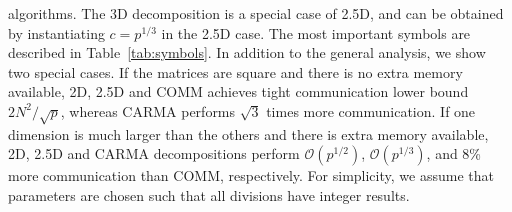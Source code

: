 \documentclass[sigplan,review,anonymous,10pt]{acmart}\settopmatter{printfolios=true,printccs=false,printacmref=false}
\newcommand\greg[1]{\textcolor{blue}{[Greg: #1]}}
\newcommand\mac[1]{\textcolor{red}{[Mac: #1]}}
\begin{document}
\begin{table}
{		algorithms. The 3D decomposition is a special case of 2.5D, and can be 
		obtained 
		by
		instantiating $c=p^{1/3}$ in the 2.5D case.
		The most important symbols are described in Table~\ref{tab:symbols}. In 
		addition to the general analysis, we show two special cases. If the 
		matrices 
		are 
		square and there is no extra memory available, 2D, 2.5D and COMM 
		achieves tight 
		communication lower bound $2N^2/\sqrt{p}$, whereas CARMA performs 
		$\sqrt{3}$ 
		times more 
		communication. If one dimension is much larger than the others and 
		there is 
		extra memory available, 2D, 2.5D and CARMA decompositions perform 
		$\mathcal{O}(p^{1/2})$, $\mathcal{O}(p^{1/3})$, and 8\%  more 
		communication 
		than COMM, respectively. For simplicity, we assume that
		parameters are chosen such that all divisions have integer results.
	}
	\vspace{-2em}
	\label{tab:summary}
\end{table}


%
\end{document}
